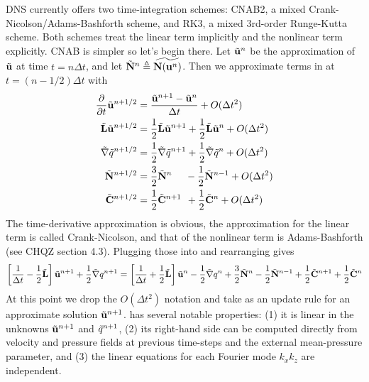 \documentclass{article}[12pt]
\begin{document}
DNS currently offers two time-integration schemes: CNAB2,
a mixed Crank-Nicolson/Adams-Bashforth scheme, and RK3, a mixed
3rd-order Runge-Kutta scheme. Both schemes treat the linear term
implicitly and the nonlinear term explicitly. CNAB is simpler so
let's begin there. Let $\tilde{{\bf u}}^n$ be the approximation of $\tilde{{\bf u}}$
at time $t=n \Delta t$, and let $\tilde{{\bf N}}^n \triangleq \widetilde{{\bf N}({\bf u}^n)}$.
Then we approximate terms in  at $t = (n-1/2) \Delta t$ with
\begin{align}
\frac{\partial}{\partial t} \tilde{{\bf u}}^{n+1/2} &= \frac{\tilde{{\bf u}}^{n+1} - \tilde{{\bf u}}^{n}}{\Delta t} + O(\Delta t^2) \\
 \tilde{{\bf L}} \tilde{{\bf u}}^{n+1/2} &= \frac{1}{2} \tilde{{\bf L}} \tilde{{\bf u}}^{n+1} + \frac{1}{2} \tilde{{\bf L}} \tilde{{\bf u}}^{n} + O(\Delta t^2) \\
 \tilde{\bf \nabla} \tilde{q}^{n+1/2} &= \frac{1}{2} \tilde{\bf \nabla} \tilde{q}^{n+1} + \frac{1}{2} \tilde{\bf \nabla} \tilde{q}^{n} + O(\Delta t^2) \\
 \tilde{{\bf N}}^{n+1/2} &= \frac{3}{2} \tilde{{\bf N}}^{n} \:\:\:\:\:\: - \frac{1}{2} \tilde{{\bf N}}^{n-1} + O(\Delta t^2) \\
 \tilde{{\bf C}}^{n+1/2} &= \frac{1}{2} \tilde{{\bf C}}^{n+1} \:\: + \frac{1}{2} \tilde{{\bf C}}^{n} + O(\Delta t^2)
\end{align}
The time-derivative approximation is obvious, the approximation for the
linear term is called Crank-Nicolson, and that of the nonlinear term is
Adams-Bashforth (see CHQZ section 4.3). Plugging those into 
and rearranging gives
\begin{align}
\left[ \frac{1}{\Delta t} - \frac{1}{2} \tilde{{\bf L}}\right] \tilde{{\bf u}}^{n+1} + \frac{1}{2} \tilde{\bf \nabla} q^{n+1}
= \left[ \frac{1}{\Delta t} + \frac{1}{2} \tilde{{\bf L}}\right] \tilde{{\bf u}}^{n} - \frac{1}{2} \tilde{\bf \nabla} q^n
+ \frac{3}{2} \tilde{{\bf N}}^{n} - \frac{1}{2} \tilde{{\bf N}}^{n-1} + \frac{1}{2} \tilde{{\bf C}}^{n+1} + \frac{1}{2} \tilde{{\bf C}}^{n} \label{CNAB}
\end{align}
At this point we drop the $O(\Delta t^2)$ notation and take 
as an update rule for an approximate solution $\tilde{{\bf u}}^{n+1}$. 
has several notable properties: (1) it is linear in the unknowns
$\tilde{{\bf u}}^{n+1}$ and $\tilde{q}^{n+1}$, (2) its right-hand side can be computed
directly from velocity and pressure fields at previous time-steps and the
external mean-pressure parameter, and (3) the linear equations for each
Fourier mode $k_x k_z$ are independent.
\end{document}

